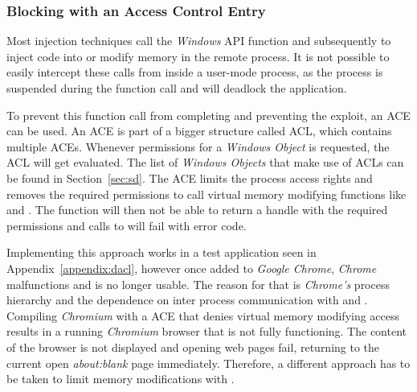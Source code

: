 \subsubsection{Blocking  with an Access Control Entry}
\label{sec:dacl}
Most injection techniques call the \emph{Windows} \gls{API} function  and subsequently  to inject code into or modify memory in the remote process. It is not possible to easily intercept these calls from inside a user-mode process, as the process is suspended during the  function call and will deadlock the application.

\medskip

To prevent this function call from completing and preventing the exploit, an \gls{ACE} can be used. An \gls{ACE} is part of a bigger structure called \gls{ACL}, which contains multiple \glspl{ACE}. Whenever permissions for a \emph{Windows Object} is requested, the \gls{ACL} will get evaluated. The list of \emph{Windows Objects} that make use of \glspl{ACL} can be found in Section~\ref{sec:sd}. The \gls{ACE} limits the process access rights and removes the required permissions to call virtual memory modifying functions like  and . The  function will then not be able to return a handle with the required permissions and calls to  will fail with  error code.

\medskip

Implementing this approach works in a test application seen in Appendix~\ref{appendix:dacl}, however once added to \emph{Google Chrome}, \emph{Chrome} malfunctions and is no longer usable. The reason for that is \emph{Chrome's} process hierarchy and the dependence on inter process communication with  and . Compiling \emph{Chromium} with a \gls{ACE} that denies virtual memory modifying access results in a running \emph{Chromium} browser that is not fully functioning. The content of the browser is not displayed and opening web pages fail, returning to the current open \emph{about:blank} page immediately. Therefore, a different approach has to be taken to limit memory modifications with .